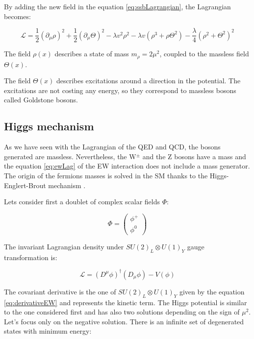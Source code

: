     By adding the new field in the equation \ref{eq:ssbLagrangian}, the Lagrangian becomes:

    \begin{equation}
      \mathcal{L} = \frac{1}{2} (\partial_{\mu}\rho)^2 + \frac{1}{2}(\partial_{\mu}\Theta)^2 - \lambda v^2 \rho^2 - \lambda v (\rho^3 +\rho \Theta^2) - \frac{\lambda}{4}(\rho^2 + \Theta^2)^2
    \end{equation}

    The field $\rho(x)$ describes a state of mass $m_{\rho} = 2 \mu^2$, coupled to the massless field $\Theta(x)$.

    The field $\Theta(x)$ describes excitations around a direction in the potential.
    The excitations are not costing any energy, so they correspond to massless bosons called Goldstone bosons.


    \subsection{Higgs mechanism}
    \label{sec:higgsMechanism}

    As we have seen with the Lagrangian of the QED and QCD, the bosons generated are massless. Nevertheless, the W$^{\pm}$ and the Z bosons have a mass and the equation \ref{eq:ewLag} of the EW interaction does not include a mass generator. 
    The origin of the fermions masses is solved in the \gls{SM} thanks to the Higgs-Englert-Brout mechanism \cite{PhysRevLett.13.508}\cite{1964PhRvL..13..321E}.

    Lets consider first a doublet of complex scalar fields $\Phi$:
    
    \begin{equation}
       \Phi = \begin{pmatrix}
                \phi^{+}\\
                \phi^{0}
              \end{pmatrix}
    \end{equation}

     The invariant Lagrangian density under $SU(2)_L \otimes U(1)_Y$ gauge transformation is:

    \begin{equation}
      \mathcal{L} = \left(D^{\mu} \phi \right)^{\dagger} \left( D_{\mu} \phi \right) - V(\phi)
      \label{eq:lagrangianHiggs}
    \end{equation}    
    
    The covariant derivative is the one of $SU(2)_L \otimes U(1)_Y$ given by the equation \ref{eq:derivativeEW} and represents the kinetic term.
    The Higgs potential is similar to the one considered first and has also two solutions depending on the sign of $\mu^2$.
    Let's focus only on the negative solution. 
    There is an infinite set of degenerated states with minimum energy:

